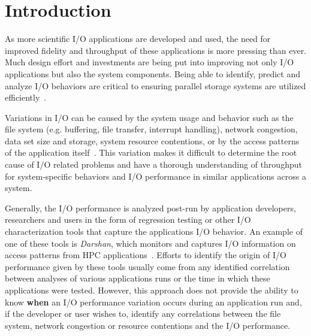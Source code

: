 \section{Introduction}
As more scientific I/O applications are developed and used, the need for
improved fidelity and throughput of these applications is more pressing than ever. 
Much design effort and investments are being put into improving not only
I/O applications but also the system components. Being able to
identify, predict and analyze I/O behaviors are critical to ensuring
parallel storage systems are utilized efficiently~\cite{costa2021}. 


Variations in I/O can be caused by the system usage and behavior such as the file system (e.g. buffering, file transfer,
interrupt handling), network congestion, data set size and storage, system resource contentions,
or by the access patterns of the application itself~\cite{I/O-performance-variation}.
This variation
makes it difficult to determine the root cause of I/O related problems
and have a thorough understanding of throughput for system-specific
behaviors and I/O performance in similar applications across a
system. 

Generally, the I/O performance is analyzed post-run by application
developers, researchers and users in the form of regression testing or
other I/O characterization tools that capture the applications I/O
behavior. An example of one of these tools is \emph{Darshan}, which
monitors and captures I/O information on access patterns from HPC
applications~\cite{Darshan}.
Efforts to identify the origin of I/O performance given by these tools
usually come from any identified correlation between analyses of
various applications runs or the time in which these applications were
tested. However, this approach does not provide the ability to know
\textbf{when} an I/O performance variation occurs during an
application run and, if the developer or user wishes to, identify any
correlations between the file system, network congestion or resource
contentions and the I/O performance.

